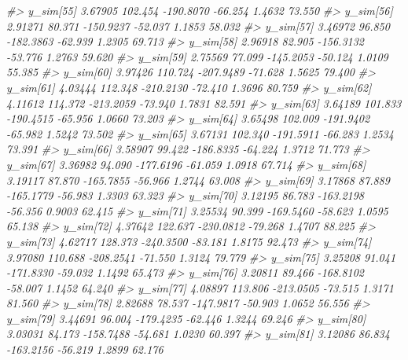 \documentclass[
  10pt,
  italian,
  a4paper,
  extrafontsizes,onecolumn,openright
  ]{memoir}
\newenvironment{Shaded}{\begin{snugshade}}{\end{snugshade}}
\newcommand{\CommentTok}[1]{\textcolor[rgb]{0.56,0.35,0.01}{\textit{#1}}}
\begin{document}
\begin{Shaded}
\begin{Highlighting}[]
\CommentTok{\#\textgreater{}   y\_sim[55]   3.67905 102.454 {-}190.8070 {-}66.254  1.4632  73.550}
\CommentTok{\#\textgreater{}   y\_sim[56]   2.91271  80.371 {-}150.9237 {-}52.037  1.1853  58.032}
\CommentTok{\#\textgreater{}   y\_sim[57]   3.46972  96.850 {-}182.3863 {-}62.939  1.2305  69.713}
\CommentTok{\#\textgreater{}   y\_sim[58]   2.96918  82.905 {-}156.3132 {-}53.776  1.2763  59.620}
\CommentTok{\#\textgreater{}   y\_sim[59]   2.75569  77.099 {-}145.2053 {-}50.124  1.0109  55.385}
\CommentTok{\#\textgreater{}   y\_sim[60]   3.97426 110.724 {-}207.9489 {-}71.628  1.5625  79.400}
\CommentTok{\#\textgreater{}   y\_sim[61]   4.03444 112.348 {-}210.2130 {-}72.410  1.3696  80.759}
\CommentTok{\#\textgreater{}   y\_sim[62]   4.11612 114.372 {-}213.2059 {-}73.940  1.7831  82.591}
\CommentTok{\#\textgreater{}   y\_sim[63]   3.64189 101.833 {-}190.4515 {-}65.956  1.0660  73.203}
\CommentTok{\#\textgreater{}   y\_sim[64]   3.65498 102.009 {-}191.9402 {-}65.982  1.5242  73.502}
\CommentTok{\#\textgreater{}   y\_sim[65]   3.67131 102.340 {-}191.5911 {-}66.283  1.2534  73.391}
\CommentTok{\#\textgreater{}   y\_sim[66]   3.58907  99.422 {-}186.8335 {-}64.224  1.3712  71.773}
\CommentTok{\#\textgreater{}   y\_sim[67]   3.36982  94.090 {-}177.6196 {-}61.059  1.0918  67.714}
\CommentTok{\#\textgreater{}   y\_sim[68]   3.19117  87.870 {-}165.7855 {-}56.966  1.2744  63.008}
\CommentTok{\#\textgreater{}   y\_sim[69]   3.17868  87.889 {-}165.1779 {-}56.983  1.3303  63.323}
\CommentTok{\#\textgreater{}   y\_sim[70]   3.12195  86.783 {-}163.2198 {-}56.356  0.9003  62.415}
\CommentTok{\#\textgreater{}   y\_sim[71]   3.25534  90.399 {-}169.5460 {-}58.623  1.0595  65.138}
\CommentTok{\#\textgreater{}   y\_sim[72]   4.37642 122.637 {-}230.0812 {-}79.268  1.4707  88.225}
\CommentTok{\#\textgreater{}   y\_sim[73]   4.62717 128.373 {-}240.3500 {-}83.181  1.8175  92.473}
\CommentTok{\#\textgreater{}   y\_sim[74]   3.97080 110.688 {-}208.2541 {-}71.550  1.3124  79.779}
\CommentTok{\#\textgreater{}   y\_sim[75]   3.25208  91.041 {-}171.8330 {-}59.032  1.1492  65.473}
\CommentTok{\#\textgreater{}   y\_sim[76]   3.20811  89.466 {-}168.8102 {-}58.007  1.1452  64.240}
\CommentTok{\#\textgreater{}   y\_sim[77]   4.08897 113.806 {-}213.0505 {-}73.515  1.3171  81.560}
\CommentTok{\#\textgreater{}   y\_sim[78]   2.82688  78.537 {-}147.9817 {-}50.903  1.0652  56.556}
\CommentTok{\#\textgreater{}   y\_sim[79]   3.44691  96.004 {-}179.4235 {-}62.446  1.3244  69.246}
\CommentTok{\#\textgreater{}   y\_sim[80]   3.03031  84.173 {-}158.7488 {-}54.681  1.0230  60.397}
\CommentTok{\#\textgreater{}   y\_sim[81]   3.12086  86.834 {-}163.2156 {-}56.219  1.2899  62.176}

\end{Highlighting}
\end{Shaded}
\end{document}
